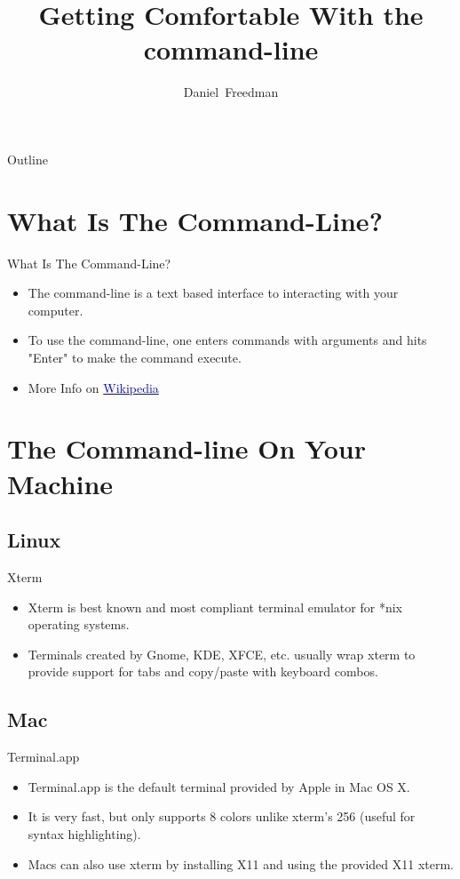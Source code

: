 \documentclass[10pt]{beamer}
\title[Getting Comfortable With the command-line]
{Getting Comfortable With the command-line}
\author[ACM Student Lecture Series]{Daniel~Freedman}
\date[September 14th, 2010]
\begin{document}
\begin{frame}
  \titlepage
\end{frame}

\begin{frame}[shrink]{Outline}
  \tableofcontents
\end{frame}

\section{What Is The Command-Line?}
\begin{frame}{What Is The Command-Line?}
  \begin{itemize}[<+->]
  \item The command-line is a text based interface to interacting with your computer.
  \item To use the command-line, one enters commands with arguments and hits "Enter" to make the command execute.
  \item More Info on \href{http://en.wikipedia.org/wiki/Command-line\_interface}{\textcolor{blue}{Wikipedia}}
  \end{itemize}
\end{frame}

\section{The Command-line On Your Machine}

\subsection{Linux}
\begin{frame}{Xterm}
\begin{itemize}[<+->]
\item Xterm is best known and most compliant terminal emulator for *nix operating systems.
\item Terminals created by Gnome, KDE, XFCE, etc. usually wrap xterm to provide support for tabs and copy/paste with keyboard combos.
\end{itemize}
\end{frame}

\subsection{Mac}
\begin{frame}{Terminal.app}
\begin{itemize}[<+->]
\item Terminal.app is the default terminal provided by Apple in Mac OS X.
\item It is very fast, but only supports 8 colors unlike xterm's 256 (useful for syntax highlighting).
\item Macs can also use xterm by installing X11 and using the provided X11 xterm.
\end{itemize}
\end{frame}
\end{document}
